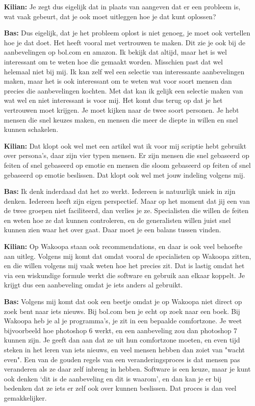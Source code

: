 \textbf{Kilian:} Je zegt dus eigelijk dat in plaats van aangeven dat er een probleem is, wat vaak gebeurt, dat je ook moet uitleggen hoe je dat kunt oplossen?

\textbf{Bas:} Dus eigelijk, dat je het probleem oplost is niet genoeg, je moet ook vertellen hoe je dat doet. Het heeft vooral met vertrouwen te maken. Dit zie je ook bij de aanbevelingen op bol.com en amazon. Ik bekijk dat altijd, maar het is wel interessant om te weten hoe die gemaakt worden. Misschien past dat wel helemaal niet bij mij. Ik kan zelf wel een selectie van interessante aanbevelingen maken, maar het is ook interessant om te weten wat voor soort mensen dan precies die aanbevelingen kochten. Met dat kan ik gelijk een selectie maken van wat wel en niet interessant is voor mij. Het komt dus terug op dat je het vertrouwen moet krijgen. Je moet kijken naar de twee soort personen. Je hebt mensen die snel keuzes maken, en mensen die meer de diepte in willen en snel kunnen schakelen.

\textbf{Kilian:} Dat klopt ook wel met een artikel wat ik voor mij scriptie hebt gebruikt over persona's, daar zijn vier typen mensen. Er zijn mensen die snel gebaseerd op feiten of snel gebaseerd op emotie en mensen die sloom gebaseerd op feiten of snel gebaseerd op emotie beslissen. Dat klopt ook wel met jouw indeling volgens mij.

\textbf{Bas:} Ik denk inderdaad dat het zo werkt. Iedereen is natuurlijk uniek in zijn denken. Iedereen heeft zijn eigen perspectief. Maar op het moment dat jij een van de twee groepen niet faciliteerd, dan verlies je ze. Specialisten die willen de feiten en weten hoe ze dat kunnen controleren, en de generalisten willen juist snel kunnen zien waar het over gaat. Daar moet je een balans tussen vinden.

\textbf{Kilian:} Op Wakoopa staan ook recommendations, en daar is ook veel behoefte aan uitleg. Volgens mij komt dat omdat vooral de specialisten op Wakoopa zitten, en die willen volgens mij vaak weten hoe het precies zit. Dat is lastig omdat het via een wiskundige formule werkt die software en gebruik aan elkaar koppelt. Je krijgt dus een aanbeveling omdat je iets anders al gebruikt.

\textbf{Bas:} Volgens mij komt dat ook een beetje omdat je op Wakoopa niet direct op zoek bent naar iets nieuws. Bij bol.com ben je echt op zoek naar een boek. Bij Wakoopa heb je al je programma's, je zit in een bepaalde comfortzone. Je weet bijvoorbeeld hoe photoshop 6 werkt, en een aanbeveling zou dan photoshop 7 kunnen zijn. Je geeft dan aan dat ze uit hun comfortzone moeten, en even tijd steken in het leren van iets nieuws, en veel mensen hebben dan zoiet van "wacht even". Een van de gouden regels van een veranderingsproces is dat mensen pas veranderen als ze daar zelf inbreng in hebben. Software is een keuze, maar je kunt ook denken `dit is de aanbeveling en dit is waarom', en dan kan je er bij bedenken dat ze iets er zelf ook over kunnen beslissen. Dat proces is dan veel gemakkelijker.

